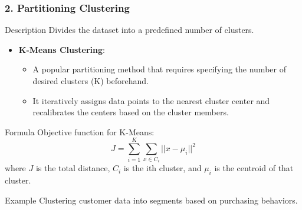 \documentclass{beamer}
\begin{document}
\begin{frame}[fragile]
    \frametitle{2. Partitioning Clustering}
    \begin{block}{Description}
        Divides the dataset into a predefined number of clusters.
    \end{block}

    \begin{itemize}
        \item \textbf{K-Means Clustering}:
            \begin{itemize}
                \item A popular partitioning method that requires specifying the number of desired clusters (K) beforehand.
                \item It iteratively assigns data points to the nearest cluster center and recalibrates the centers based on the cluster members.
            \end{itemize}
    \end{itemize}

    \begin{block}{Formula}
        Objective function for K-Means:
        \begin{equation}
            J = \sum_{i=1}^{K} \sum_{x \in C_i} || x - \mu_i ||^2
        \end{equation}
        where \(J\) is the total distance, \(C_i\) is the ith cluster, and \(\mu_i\) is the centroid of that cluster.
    \end{block}

    \begin{block}{Example}
        Clustering customer data into segments based on purchasing behaviors.
    \end{block}
\end{frame}
\end{document}
